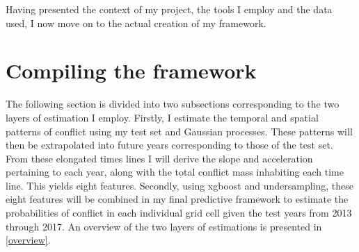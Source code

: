 \documentclass[a4paper]{article}
\begin{document}
Having presented the context of my project, the tools I employ and the data used, I now move on to the actual creation of my framework.\par


\section{Compiling the framework}%

The following section is divided into two subsections corresponding to the two layers of estimation I employ. Firstly, I estimate the temporal and spatial patterns of conflict using my test set and Gaussian processes. These patterns will then be extrapolated into future years corresponding to those of the test set. From these elongated times lines I will derive the slope and acceleration pertaining to each year, along with the total conflict mass inhabiting each time line. This yields eight features. Secondly, using xgboost and undersampling, these eight features will be combined in my final predictive framework to estimate the probabilities of conflict in each individual grid cell given the test years from 2013 through 2017. An overview of the two layers of estimations is presented in \autoref{overview}.\par
\end{document}
